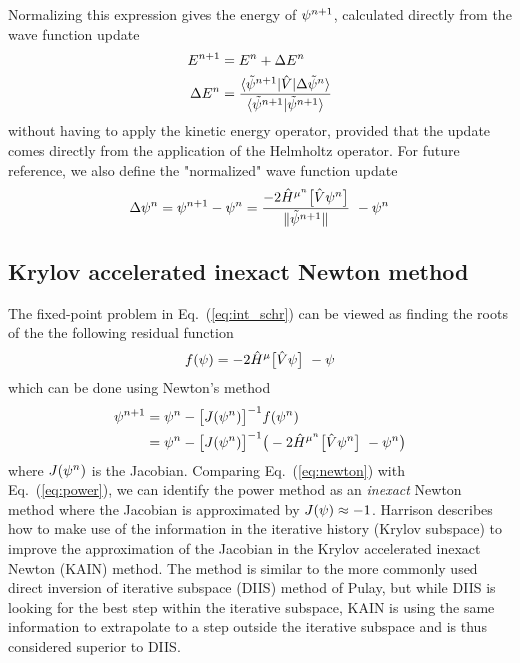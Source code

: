 Normalizing this expression gives the energy of $\psi^{n+1}$, calculated directly from
the wave function update
\begin{align}
    E^{n+1} &= E^{n} + \Delta E^n\\
    \label{eq:energy_update}
    \Delta E^n &= 
	\frac{\langle\tilde{\psi}^{n+1}| \hat{V} |\Delta\tilde{\psi}^{n}\rangle}
	{\langle\tilde{\psi}^{n+1}|\tilde{\psi}^{n+1}\rangle}
\end{align}
without having to apply the kinetic energy operator, provided that the update comes directly 
from the application of the Helmholtz operator. For future reference, we also define the 
"normalized" wave function update 
\begin{equation}
    \label{eq:wavefunction_update}
    \Delta\wavefunction^n = \wavefunction^{n+1} - \wavefunction^n = 
	\frac{-2\hat{H}^{\mu^n}\big[\hat{V}\wavefunction^n\big]}{\|\tilde{\wavefunction}^{n+1}\|} 
	- \wavefunction^n
\end{equation}

\subsection{Krylov accelerated inexact Newton method}
The fixed-point problem in Eq.~(\ref{eq:int_schr}) can be viewed as finding 
the roots of the the following residual function
\begin{equation}
    f(\wavefunction) =  -2 \hat{H}^{\mu}\big[\hat{V}\wavefunction\big] - \wavefunction
\end{equation}
which can be done using Newton's method
\begin{align}
    \wavefunction^{n+1}	&= \wavefunction^n - \big[J(\wavefunction^n)\big]^{-1}f(\wavefunction^n)\\
    \label{eq:newton}
	&= \wavefunction^n - \big[J(\wavefunction^n)\big]^{-1}
	    \big(-2\hat{H}^{\mu^n}\big[\hat{V}\wavefunction^n\big] - \wavefunction^n\big)
\end{align}
where $J(\psi^n)$ is the Jacobian. Comparing Eq.~(\ref{eq:newton}) with 
Eq.~(\ref{eq:power}), we can identify the power method as an \emph{inexact} 
Newton method where the Jacobian is approximated by $J(\psi) \approx -1$.
Harrison\cite{Harrison_kain:2004} describes how to make use of the information in the
iterative history (Krylov subspace) to improve the approximation of the 
Jacobian in the Krylov accelerated inexact Newton (KAIN) method. The method 
is similar to the more commonly used direct inversion of iterative subspace 
(DIIS) method of Pulay\cite{Pulay:1980}, but while DIIS is looking for the best 
step within the iterative subspace, KAIN is using the same information to 
extrapolate to a step outside the iterative subspace and is thus considered 
superior to DIIS\cite{Harrison_kain:2004}.

